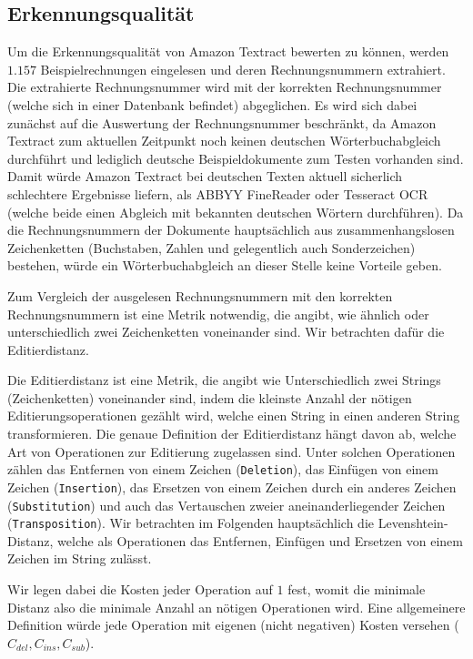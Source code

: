 \documentclass{whswinvcbook}
\begin{document}
\subsection{Erkennungsqualität}
Um die Erkennungsqualität von Amazon Textract bewerten zu können, werden $1.157$ Beispielrechnungen eingelesen und deren Rechnungsnummern extrahiert. Die extrahierte Rechnungsnummer wird mit der korrekten Rechnungsnummer (welche sich in einer Datenbank befindet) abgeglichen. Es wird sich dabei zunächst auf die Auswertung der Rechnungsnummer beschränkt, da Amazon Textract zum aktuellen Zeitpunkt noch keinen deutschen Wörterbuchabgleich durchführt und lediglich deutsche Beispieldokumente zum Testen vorhanden sind. Damit würde Amazon Textract bei deutschen Texten aktuell sicherlich schlechtere Ergebnisse liefern, als ABBYY FineReader oder Tesseract OCR (welche beide einen Abgleich mit bekannten deutschen Wörtern durchführen). Da die Rechnungsnummern der Dokumente hauptsächlich aus zusammenhangslosen Zeichenketten (Buchstaben, Zahlen und gelegentlich auch Sonderzeichen) bestehen, würde ein Wörterbuchabgleich an dieser Stelle keine Vorteile geben.

Zum Vergleich der ausgelesen Rechnungsnummern mit den korrekten Rechnungsnummern ist eine Metrik notwendig, die angibt, wie ähnlich oder unterschiedlich zwei Zeichenketten voneinander sind. Wir betrachten dafür die Editierdistanz.

Die Editierdistanz ist eine Metrik, die angibt wie Unterschiedlich zwei Strings (Zeichenketten) voneinander sind, indem die kleinste Anzahl der nötigen Editierungsoperationen gezählt wird, welche einen String in einen anderen String transformieren. Die genaue Definition der Editierdistanz hängt davon ab, welche Art von Operationen zur Editierung zugelassen sind. Unter solchen Operationen zählen das Entfernen von einem Zeichen (\texttt{Deletion}), das Einfügen von einem Zeichen (\texttt{Insertion}), das Ersetzen von einem Zeichen durch ein anderes Zeichen (\texttt{Substitution}) und auch das Vertauschen zweier aneinanderliegender Zeichen (\texttt{Transposition}). Wir betrachten im Folgenden hauptsächlich die Levenshtein-Distanz, welche als Operationen das Entfernen, Einfügen und Ersetzen von einem Zeichen im String zulässt.

Wir legen dabei die Kosten jeder Operation auf $1$ fest, womit die minimale Distanz also die minimale Anzahl an nötigen Operationen wird. Eine allgemeinere Definition würde jede Operation mit eigenen (nicht negativen) Kosten versehen ($C_{del},C_{ins},C_{sub}$).
\end{document}
